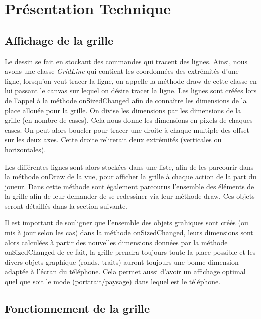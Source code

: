 \documentclass[12pt, a4paper]{article}%
\begin{document}
\section{Présentation Technique}
    \subsection{Affichage de la grille}
    Le dessin se fait en stockant des commandes qui tracent des lignes. Ainsi, nous avons une classe \textit{GridLine} qui
    contient les coordonnées des extrémités d'une ligne, lorsqu'on veut tracer la ligne, on appelle la méthode draw de cette
    classe en lui passant le canvas sur lequel on désire tracer la ligne. Les lignes sont créées lors de l'appel à la méthode
    onSizedChanged afin de connaître les dimensions de la place allouée pour la grille. On divise les dimensions par les
    dimensions de la grille (en nombre de cases). Cela nous donne les dimensions en pixels de chaques cases. On peut alors boucler
    pour tracer une droite à chaque multiple des offset sur les deux axes. Cette droite relirerait deux extrémités (verticales ou
    horizontales).
    \newline

    Les différentes lignes sont alors stockées dans une liste, afin de les parcourir dans la méthode onDraw de la vue, pour
    afficher la grille à chaque action de la part du joueur. Dans cette méthode sont également parcourus l'ensemble des éléments
    de la grille afin de leur demander de se redessiner via leur méthode draw. Ces objets seront détaillés dans la section
    suivante.
    \newline

    Il est important de souligner que l'ensemble des objets grahiques sont créés (ou mis à jour selon les cas) dans la méthode
    onSizedChanged, leurs dimensions sont alors calculées à partir des nouvelles dimensions données par la méthode onSizedChanged
    de ce fait, la grille prendra toujours toute la place possible et les divers objets graphique (ronds, traits) auront toujours
    une bonne dimension adaptée à l'écran du téléphone. Cela permet aussi d'avoir un affichage optimal quel que soit le mode
    (porttrait/paysage) dans lequel est le téléphone.
    \subsection{Fonctionnement de la grille}
\end{document}
